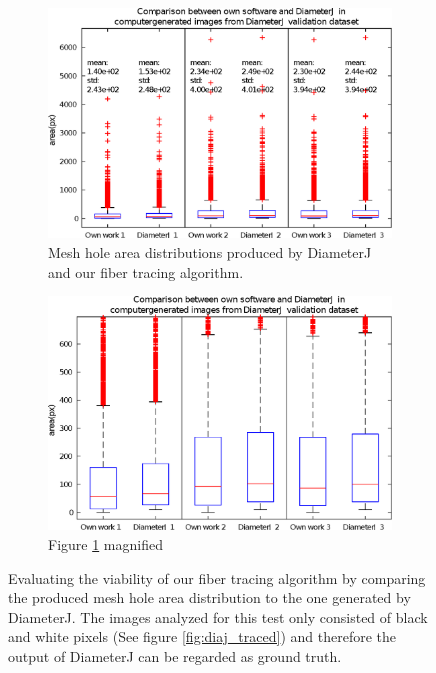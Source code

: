 \documentclass[12pt,english,twocolumn]{revtex4}
\begin{document}
\begin{figure}[h!]
	\begin{subfigure}[b]{\linewidth}
		\includegraphics[width=\linewidth]{illustrations/sef_vs_diaj_new.eps}
		\caption{Mesh hole area distributions produced by DiameterJ and our fiber tracing algorithm.}
		\label{subfig:self_vs_diaj}
	\end{subfigure}
	\begin{subfigure}[b]{\linewidth}
		\includegraphics[width=\linewidth]{illustrations/sef_vs_diaj_new_zoom.eps}
		\caption{Figure \ref{subfig:self_vs_diaj} magnified}
	\end{subfigure}
	\caption{Evaluating the viability of our fiber tracing algorithm by comparing the produced mesh hole area distribution to the one generated by DiameterJ. The images analyzed for this test only consisted of black and white pixels (See figure \ref{fig:diaj_traced}) and therefore the output of DiameterJ can be regarded as ground truth.}
	\label{fig:diaj_comp}
\end{figure}
\end{document}
